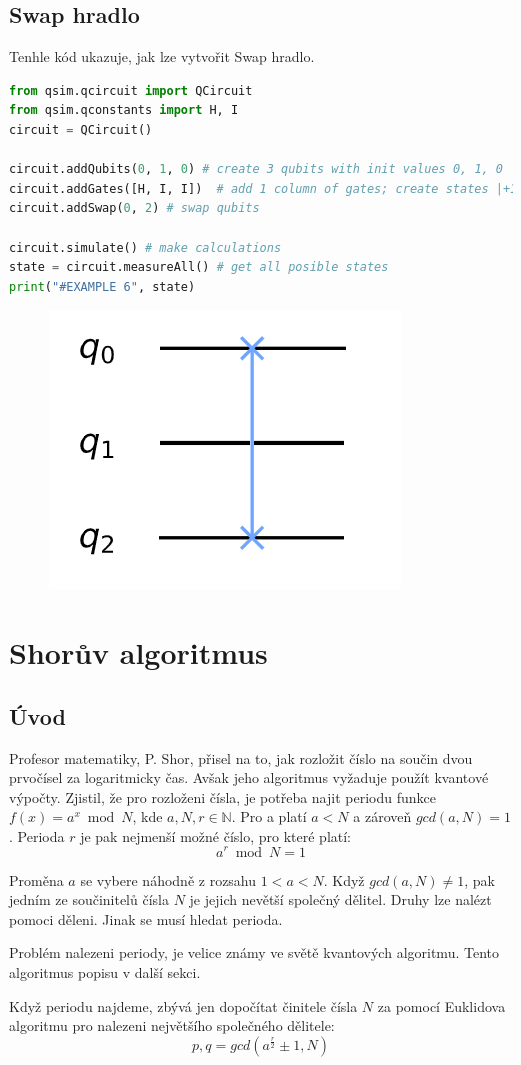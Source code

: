 \documentclass[11pt]{article}
\begin{document}
\subsection{Swap hradlo}
Tenhle kód ukazuje, jak lze vytvořit Swap hradlo.
\begin{lstlisting}[language=Python, caption=Toffoli gate]
from qsim.qcircuit import QCircuit
from qsim.qconstants import H, I
circuit = QCircuit()

circuit.addQubits(0, 1, 0) # create 3 qubits with init values 0, 1, 0
circuit.addGates([H, I, I])  # add 1 column of gates; create states |+10>
circuit.addSwap(0, 2) # swap qubits

circuit.simulate() # make calculations
state = circuit.measureAll() # get all posible states
print("#EXAMPLE 6", state)
\end{lstlisting}
\begin{figure}[H]
    \includegraphics[scale=.7]{swap_scheme}
    \centering
\end{figure}

\newpage

\section{Shorův algoritmus}
\subsection{Úvod}
Profesor matematiky, P. Shor, přisel na to, jak rozložit číslo na součin dvou prvočísel za logaritmicky čas.
Avšak jeho algoritmus vyžaduje použít kvantové výpočty. Zjistil, že pro rozloženi čísla,
je potřeba najit periodu funkce $f(x) = a^x \bmod N$, kde $a, N, r \in \mathbb{N}$.
Pro a platí $a < N$ a zároveň $gcd(a, N) = 1$.
Perioda $r$ je pak nejmenší možné číslo, pro které platí:
$$a^r \bmod N = 1$$
\par Proměna $a$ se vybere náhodně z rozsahu $1 < a < N$.
Když $gcd(a, N) \ne 1$, pak jedním ze součinitelů čísla $N$ je jejich nevětší společný dělitel.
Druhy lze nalézt pomoci děleni. Jinak se musí hledat perioda.
\par Problém nalezeni periody, je velice známy ve světě kvantových algoritmu. Tento algoritmus popisu v další sekci.
\par Když periodu najdeme, zbývá jen dopočítat činitele čísla $N$ za pomocí Euklidova algoritmu pro nalezeni největšího společného dělitele:
$$p, q = gcd(a^\frac{r}{2} \pm 1, N)$$
\end{document}
